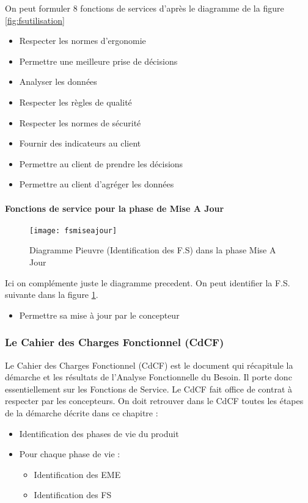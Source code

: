 On peut formuler 8 fonctions de services d’après le diagramme de la figure \ref{fig:fsutilisation}
\begin{itemize}
    \item Respecter les normes d’ergonomie
    \item Permettre une meilleure prise de décisions
    \item Analyser les données
    \item Respecter les règles de qualité 
    \item Respecter les normes de sécurité
    \item Fournir des indicateurs au client
    \item Permettre au client de prendre les décisions
    \item Permettre au client d'agréger les données
\end{itemize}



\paragraph{Fonctions de service pour la phase de Mise A Jour}

\begin{figure}[H]
    \centering
    \texttt{[image: fsmiseajour]}
    \caption{Diagramme Pieuvre (Identification des F.S) dans la phase Mise A Jour}
    \label{fig:fsmiseajour}
\end{figure}



Ici on complémente juste le diagramme precedent. On peut identifier la F.S. suivante dans la figure \ref{fig:fsmiseajour}.
\begin{itemize}
    \item Permettre sa mise à jour par le concepteur
\end{itemize} 



\subsubsection{Le Cahier des Charges Fonctionnel (CdCF)}
Le Cahier des Charges Fonctionnel (CdCF) est le document qui récapitule la démarche et les résultats de l’Analyse Fonctionnelle du Besoin. Il porte donc essentiellement sur les Fonctions de Service. Le CdCF fait office de contrat à respecter par les concepteurs. On doit retrouver dans le CdCF toutes les étapes de la démarche décrite dans ce chapitre :
\begin{itemize}
    \item Identification des phases de vie du produit
    \item Pour chaque phase de vie :
    \begin{itemize}
        \item Identification des EME
        \item Identification des FS 
    \end{itemize}
\end{itemize}

